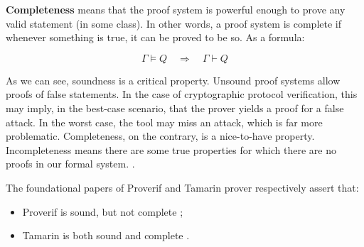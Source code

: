 \textbf{Completeness} means that the proof system is powerful enough to prove any valid statement (in some class). In other words, a proof system is complete if whenever something is true, it can be proved to be so. As a formula:

\begin{equation}
    \Gamma \models Q \quad \Longrightarrow \quad \Gamma \vdash Q
\end{equation}

As we can see, soundness is a critical property. Unsound proof systems allow proofs of false statements. In the case of cryptographic protocol verification, this may imply, in the best-case scenario, that the prover yields a proof for a false attack. In the worst case, the tool may miss an attack, which is far more problematic.
Completeness, on the contrary, is a nice-to-have property. Incompleteness means there are some true properties for which there are no proofs in our formal system. \cite{slides_on_sound_complete}.

The foundational papers of Proverif and Tamarin prover respectively assert that:
\begin{itemize}
    \item Proverif is sound, but not complete \cite{ProverifManual};
    \item Tamarin is both sound and complete \cite{TamarinFoundations, TamarinFoundationsExtended, xor_tamarin}.
\end{itemize}

